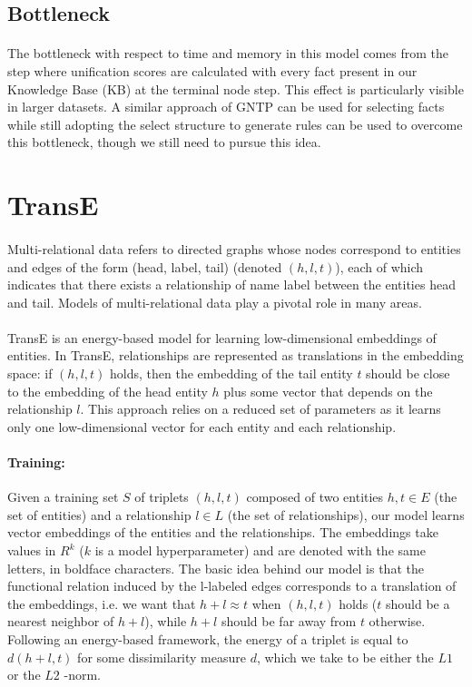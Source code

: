 \documentclass[Other]{iitddiss}
\begin{document}
\subsection{Bottleneck}
\paragraph{}
The bottleneck with respect to time and memory in this model comes from the step where unification scores are calculated with every fact present in our Knowledge Base (KB) at the terminal node step. This effect is particularly visible in larger datasets. A similar approach of GNTP can be used for selecting facts while still adopting the select structure to generate rules can be used to overcome this bottleneck, though we still need to pursue this idea. 


\section{TransE}
\paragraph{}
Multi-relational data refers to directed graphs whose nodes correspond to entities and edges of the form (head, label, tail) (denoted \((h, l, t)\)), each of which indicates that there exists a relationship of name label between the entities head and tail. Models of multi-relational data play a pivotal role in many areas.

\paragraph{}
TransE is an energy-based model for learning low-dimensional embeddings of entities. In TransE, relationships are represented as translations in the embedding space: if \((h, l, t)\) holds, then the embedding of the tail entity \(t\) should be close to the embedding of the head entity \(h\) plus some vector that depends on the relationship \(l\). This approach relies on a reduced set of parameters as it learns only one low-dimensional vector for each entity and each relationship.

\paragraph{Training:}
Given a training set \(S\) of triplets \((h, l, t)\) composed of two entities \(h, t \in E\) (the set of entities) and a relationship \(l \in L\) (the set of relationships), our model learns vector embeddings of the entities and the relationships. The embeddings take values in \(R^{k}\) (\(k\) is a model hyperparameter) and are denoted with the same letters, in boldface characters. The basic idea behind our model is that the functional relation induced by the l-labeled edges corresponds to a translation of the embeddings, i.e. we want that \(h + l \approx t\) when \((h, l, t)\) holds (\(t\) should be a nearest neighbor of \(h + l\)), while \(h + l\) should be far away from \(t\) otherwise. Following an energy-based framework, the energy of a triplet is equal to \(d(h + l, t)\) for some dissimilarity measure \(d\), which we take to be either the \(L1\) or the \(L2\) -norm.
\end{document}
